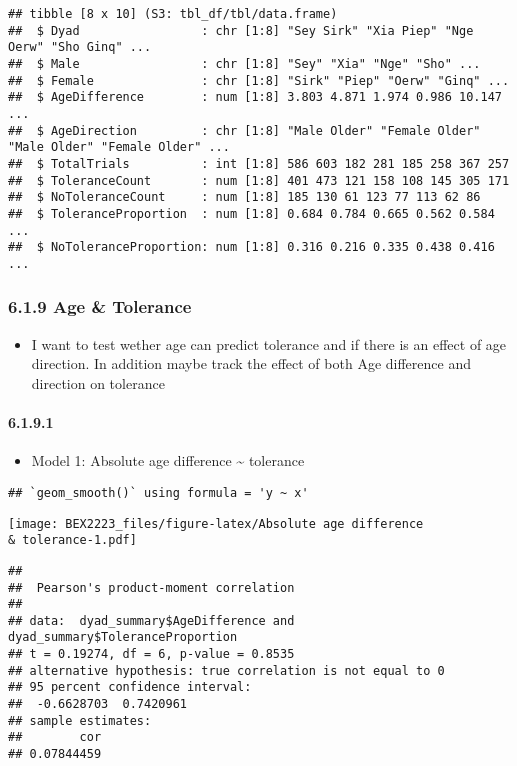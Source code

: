 \documentclass[
]{article}
\providecommand{\tightlist}{%
  \setlength{\itemsep}{0pt}\setlength{\parskip}{0pt}}
\begin{document}
\begin{verbatim}
## tibble [8 x 10] (S3: tbl_df/tbl/data.frame)
##  $ Dyad                 : chr [1:8] "Sey Sirk" "Xia Piep" "Nge Oerw" "Sho Ginq" ...
##  $ Male                 : chr [1:8] "Sey" "Xia" "Nge" "Sho" ...
##  $ Female               : chr [1:8] "Sirk" "Piep" "Oerw" "Ginq" ...
##  $ AgeDifference        : num [1:8] 3.803 4.871 1.974 0.986 10.147 ...
##  $ AgeDirection         : chr [1:8] "Male Older" "Female Older" "Male Older" "Female Older" ...
##  $ TotalTrials          : int [1:8] 586 603 182 281 185 258 367 257
##  $ ToleranceCount       : num [1:8] 401 473 121 158 108 145 305 171
##  $ NoToleranceCount     : num [1:8] 185 130 61 123 77 113 62 86
##  $ ToleranceProportion  : num [1:8] 0.684 0.784 0.665 0.562 0.584 ...
##  $ NoToleranceProportion: num [1:8] 0.316 0.216 0.335 0.438 0.416 ...
\end{verbatim}

\hypertarget{age-tolerance}{%
\subsubsection{6.1.9 Age \& Tolerance}\label{age-tolerance}}

\begin{itemize}
\tightlist
\item
  I want to test wether age can predict tolerance and if there is an
  effect of age direction. In addition maybe track the effect of both
  Age difference and direction on tolerance
\end{itemize}

\hypertarget{section-2}{%
\paragraph{6.1.9.1}\label{section-2}}

\begin{itemize}
\tightlist
\item
  Model 1: Absolute age difference \textasciitilde{} tolerance
\end{itemize}

\begin{verbatim}
## `geom_smooth()` using formula = 'y ~ x'
\end{verbatim}

\texttt{[image: BEX2223\_files/figure-latex/Absolute age difference \\\& tolerance-1.pdf]}

\begin{verbatim}
## 
##  Pearson's product-moment correlation
## 
## data:  dyad_summary$AgeDifference and dyad_summary$ToleranceProportion
## t = 0.19274, df = 6, p-value = 0.8535
## alternative hypothesis: true correlation is not equal to 0
## 95 percent confidence interval:
##  -0.6628703  0.7420961
## sample estimates:
##        cor 
## 0.07844459
\end{verbatim}
\end{document}
